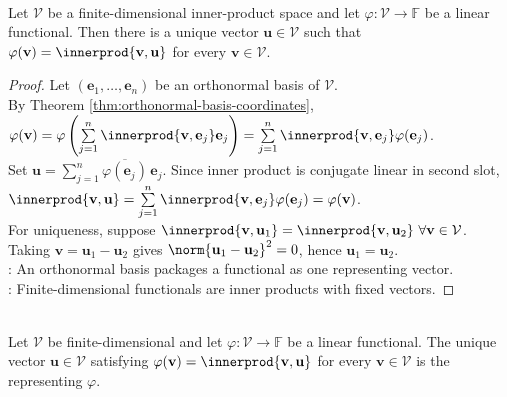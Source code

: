 \begin{theorem} \label{thm:riesz-representation-finite-dimensional} \\
Let $\mathcal{V}$ be a finite-dimensional inner-product space and let $\varphi:\mathcal{V}\to\mathbb{F}$ be a linear functional. Then there is a unique vector $\mathbf{u}\in\mathcal{V}$ such that $\varphi(\mathbf{v})=\innerprod{\mathbf{v},\mathbf{u}}$ for every $\mathbf{v}\in\mathcal{V}$.
\begin{proof}
Let $(\mathbf{e}_1,\ldots,\mathbf{e}_n)$ be an orthonormal basis of $\mathcal{V}$.\\
By Theorem \ref{thm:orthonormal-basis-coordinates}, $\varphi(\mathbf{v}) =\varphi\left(\sum\limits_{j=1}^{n}\innerprod{\mathbf{v},\mathbf{e}_j}\mathbf{e}_j\right) =\sum\limits_{j=1}^{n}\innerprod{\mathbf{v},\mathbf{e}_j}\varphi(\mathbf{e}_j)$.\\
Set $\mathbf{u}=\sum\limits_{j=1}^{n}\overline{\varphi(\mathbf{e}_j)}\,\mathbf{e}_j$. Since inner product is conjugate linear in second slot, $\innerprod{\mathbf{v},\mathbf{u}} =\sum\limits_{j=1}^{n}\innerprod{\mathbf{v},\mathbf{e}_j}\varphi(\mathbf{e}_j) =\varphi(\mathbf{v})$.\\
For uniqueness, suppose $\innerprod{\mathbf{v},\mathbf{u}_1}=\innerprod{\mathbf{v},\mathbf{u}_2} \ \forall \mathbf{v}\in\mathcal{V}$. Taking $\mathbf{v}=\mathbf{u}_1-\mathbf{u}_2$ gives $\norm{\mathbf{u}_1-\mathbf{u}_2}^2=0$, hence $\mathbf{u}_1=\mathbf{u}_2$.\\
: An orthonormal basis packages a functional as one representing vector.\\
: Finite-dimensional functionals are inner products with fixed vectors.
\end{proof}
\end{theorem}

\begin{definition} \label{def:riesz-vector} \\
Let $\mathcal{V}$ be finite-dimensional and let $\varphi:\mathcal{V}\to\mathbb{F}$ be a linear functional. The unique vector $\mathbf{u}\in\mathcal{V}$ satisfying $\varphi(\mathbf{v})=\innerprod{\mathbf{v},\mathbf{u}}$ for every $\mathbf{v}\in\mathcal{V}$ is the  representing $\varphi$.
\end{definition}

